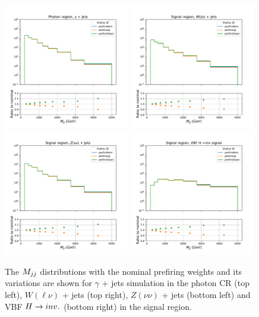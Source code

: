 \begin{figure}[htbp]
  \centering
    \includegraphics[width=0.49\textwidth]{ScaleFactors/Prefire/cr_g_vbf.pdf}
    \includegraphics[width=0.49\textwidth]{ScaleFactors/Prefire/sr_vbf_qcd_wlv.pdf} \\
    \includegraphics[width=0.49\textwidth]{ScaleFactors/Prefire/sr_vbf_qcd_zvv.pdf}
    \includegraphics[width=0.49\textwidth]{ScaleFactors/Prefire/sr_vbf_vbfhinv.pdf}
    \caption{The $M_{jj}$ distributions with the nominal prefiring weights and its variations
    are shown for $\gamma$ + jets simulation in the photon CR (top left), $W(\ell\nu)$ + jets (top right),
    $Z(\nu\nu)$ + jets (bottom left) and VBF $H \rightarrow inv.$ (bottom right) in the signal region.}
    \label{fig:prefiring_2}
\end{figure}

